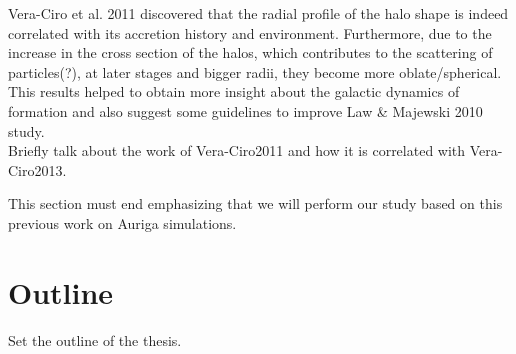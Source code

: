 Vera-Ciro et al. 2011 discovered that the radial profile of the halo shape is indeed correlated with its accretion history and environment. Furthermore, due to the increase in the cross section of the halos, which contributes to the scattering of particles(?), at later stages and bigger radii, they become more oblate/spherical. This results helped to obtain more insight about the galactic dynamics of formation and also suggest some guidelines to improve Law & Majewski 2010 study.\\





Briefly talk about the work of Vera-Ciro2011 and how it is correlated with Vera-Ciro2013.

This section must end emphasizing that we will perform our study based on this previous work on Auriga simulations.

\section{Outline}

Set the outline of the thesis.